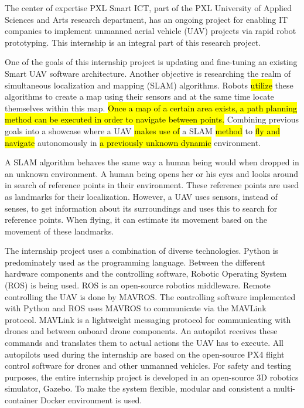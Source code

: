 The center of expertise PXL Smart ICT, part of the PXL University of Applied Sciences and Arts research department, has an ongoing project for enabling IT companies to implement unmanned aerial vehicle (UAV) projects via rapid robot prototyping. This internship is an integral part of this research project.

One of the goals of this internship project is updating and fine-tuning an existing Smart UAV software architecture. Another objective is researching the realm of simultaneous localization and mapping (SLAM) algorithms. Robots \hl{utilize} these algorithms to create a map using their sensors and at the same time locate themselves within this map. \hl{Once a map of a certain area exists, a path planning method can be executed in order to navigate between points.} Combining previous goals into a showcase where a UAV \hl{makes use of} a SLAM \hl{method} to \hl{fly and navigate} autonomously in \hl{a previously unknown dynamic} environment.

A SLAM algorithm behaves the same way a human being would when dropped in an unknown environment. A human being opens her or his eyes and looks around in search of reference points in their environment. These reference points are used as landmarks for their localization. However, a UAV uses sensors, instead of senses, to get information about its surroundings and uses this to search for reference points. When flying, it can estimate its movement based on the movement of these landmarks.

The internship project uses a combination of diverse technologies. Python is predominately used as the programming language. Between the different hardware components and the controlling software, Robotic Operating System (ROS) is being used. ROS is an open-source robotics middleware. Remote controlling the UAV is done by MAVROS. The controlling software implemented with Python and ROS uses MAVROS to communicate via the MAVLink protocol. MAVLink is a lightweight messaging protocol for communicating with drones and between onboard drone components. An autopilot receives these commands and translates them to actual actions the UAV has to execute. All autopilots used during the internship are based on the open-source PX4 flight control software for drones and other unmanned vehicles. For safety and testing purposes, the entire internship project is developed in an open-source 3D robotics simulator, Gazebo. To make the system flexible, modular and consistent a multi-container Docker environment is used.

